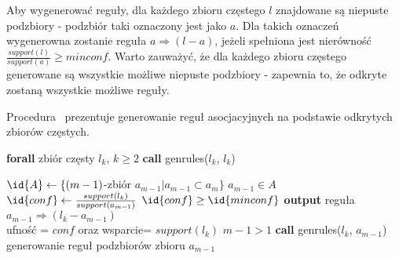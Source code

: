 Aby wygenerować reguły, dla każdego zbioru częstego $l$ znajdowane są niepuste podzbiory - podzbiór taki oznaczony jest jako $a$. Dla takich oznaczeń wygenerowna zostanie reguła $a \Rightarrow (l-a)$, jeżeli spełniona jest nierówność $\frac{support(l)}{support(a)} \geq minconf$. Warto zauważyć, że dla każdego zbioru częstego generowane są wszystkie możliwe niepuste podzbiory - zapewnia to, że odkryte zostaną wszystkie możliwe reguły.

Procedura~ prezentuje generowanie reguł asocjacyjnych na podstawie odkrytych zbiorów częstych.

\begin{codebox}
		\li \textbf{forall} zbiór częsty $l_k$, $k \geq 2$ \Do
			\li \textbf{call} genrules($l_k$, $l_k$)
					\End
		\End
\end{codebox}


\begin{codebox}
		\li $\id{A} \gets \lbrace (m-1)$-zbiór $a_{m-1} | a_{m-1} \subset a_m \rbrace$
		\li \For $a_{m-1} \in A$
			\li \Do
			\li $\id{conf} \gets \frac{support(l_k)}{support(a_{m-1})}$
			\li \If $\id{conf} \geq \id{minconf}$
				\li \Then
						\li \textbf{output} reguła $a_{m-1} \Rightarrow (l_k - a_{m-1})$ \\ ufność = $conf$ oraz wsparcie= $support(l_k)$
						\li \If $m-1 > 1$ 
							\li \Then
							\li \textbf{call} genrules($l_k$, $a_{m-1}$) \\ generowanie reguł podzbiorów zbioru $a_{m-1}$
						\End
				\End
			\End
		\End
\end{codebox}



 


